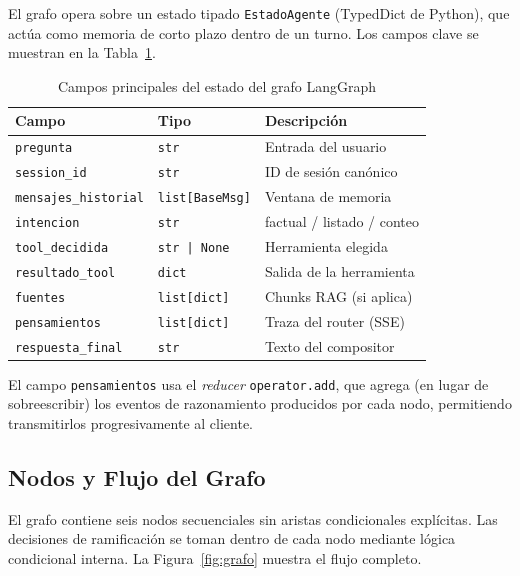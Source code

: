 \documentclass[conference]{IEEEtran}
\newcommand{\code}[1]{\texttt{\small #1}}
\begin{document}
El grafo opera sobre un estado tipado \code{EstadoAgente} (TypedDict de
Python), que actúa como memoria de corto plazo dentro de un turno. Los campos
clave se muestran en la Tabla~\ref{tab:estado}.

\begin{table}[ht]
\centering
\caption{Campos principales del estado del grafo LangGraph}
\label{tab:estado}
\setlength{\tabcolsep}{3pt}
\begin{tabular}{@{}lll@{}}
\toprule
\textbf{Campo} & \textbf{Tipo} & \textbf{Descripción} \\
\midrule
\code{pregunta}            & \code{str}           & Entrada del usuario \\
\code{session\_id}         & \code{str}           & ID de sesión canónico \\
\code{mensajes\_historial} & \code{list[BaseMsg]} & Ventana de memoria \\
\code{intencion}           & \code{str}           & factual / listado / conteo \\
\code{tool\_decidida}      & \code{str | None}    & Herramienta elegida \\
\code{resultado\_tool}     & \code{dict}          & Salida de la herramienta \\
\code{fuentes}             & \code{list[dict]}    & Chunks RAG (si aplica) \\
\code{pensamientos}        & \code{list[dict]}    & Traza del router (SSE) \\
\code{respuesta\_final}    & \code{str}           & Texto del compositor \\
\bottomrule
\end{tabular}
\end{table}

El campo \code{pensamientos} usa el \textit{reducer} \code{operator.add}, que
agrega (en lugar de sobreescribir) los eventos de razonamiento producidos por
cada nodo, permitiendo transmitirlos progresivamente al cliente.

\subsection{Nodos y Flujo del Grafo}

El grafo contiene seis nodos secuenciales sin aristas condicionales
explícitas. Las decisiones de ramificación se toman dentro de cada nodo
mediante lógica condicional interna. La Figura~\ref{fig:grafo} muestra el
flujo completo.
\end{document}
